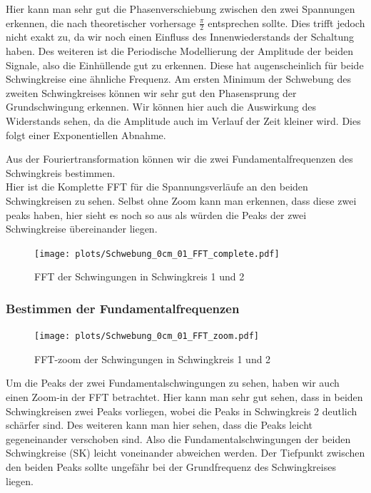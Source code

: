 \documentclass[twoside]{protokoll}
\begin{document}
Hier kann man sehr gut die Phasenverschiebung zwischen den zwei Spannungen erkennen, die nach theoretischer vorhersage $\frac{\pi}{2}$ entsprechen sollte. 
Dies trifft jedoch nicht exakt zu, da wir noch einen Einfluss des Innenwiederstands der Schaltung haben.
Des weiteren ist die Periodische Modellierung der Amplitude der beiden Signale, also die Einhüllende gut zu erkennen. 
Diese hat augenscheinlich für beide Schwingkreise eine ähnliche Frequenz.
Am ersten Minimum der Schwebung des zweiten Schwingkreises können wir sehr gut den Phasensprung der Grundschwingung erkennen.
Wir können hier auch die Auswirkung des Widerstands sehen, da die Amplitude auch im Verlauf der Zeit kleiner wird. 
Dies folgt einer Exponentiellen Abnahme.

Aus der Fouriertransformation können wir die zwei Fundamentalfrequenzen des Schwingkreis bestimmen. \\

Hier ist die Komplette FFT für die Spannungsverläufe an den beiden Schwingkreisen zu sehen. Selbst ohne Zoom kann man erkennen, dass diese zwei peaks haben, hier sieht es noch so aus als würden die Peaks der zwei Schwingkreise übereinander liegen.

\begin{figure}[H]
    \centering
    \texttt{[image: plots/Schwebung\_0cm\_01\_FFT\_complete.pdf]}
    \caption{FFT der Schwingungen in Schwingkreis 1 und 2}
\end{figure}

\subsubsection{Bestimmen der Fundamentalfrequenzen}

\begin{figure}[H]
    \centering
    \texttt{[image: plots/Schwebung\_0cm\_01\_FFT\_zoom.pdf]}
    \caption{FFT-zoom der Schwingungen in Schwingkreis 1 und 2}
\end{figure}

Um die Peaks der zwei Fundamentalschwingungen zu sehen, haben wir auch einen Zoom-in der FFT betrachtet. 
Hier kann man sehr gut sehen, dass in beiden Schwingkreisen zwei Peaks vorliegen, wobei die Peaks in Schwingkreis 2 deutlich schärfer sind. 
Des weiteren kann man hier sehen, dass die Peaks leicht gegeneinander verschoben sind. Also die Fundamentalschwingungen der beiden Schwingkreise (SK) leicht voneinander abweichen werden.
Der Tiefpunkt zwischen den beiden Peaks sollte ungefähr bei der Grundfrequenz des Schwingkreises liegen.\\
\end{document}
